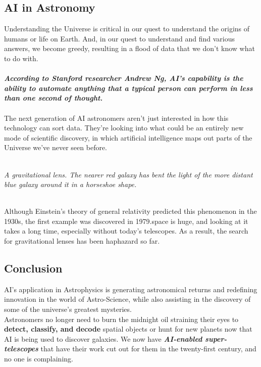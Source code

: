 \documentclass[12pt]{article}
\begin{document}
\subsection* {AI in Astronomy} 
Understanding the Universe is critical in our quest to understand the origins of humans or life on Earth. And, in our quest to understand and find various answers, we become greedy, resulting in a flood of data that we don't know what to do with.
\\
\\
\textbf{\textit{According to Stanford researcher Andrew Ng, AI's capability is the ability to automate anything that a typical person can perform in less than one second of thought.}}
\\
\\
The next generation of AI astronomers aren't just interested in how this technology can sort data. They're looking into what could be an entirely new mode of scientific discovery, in which artificial intelligence maps out parts of the Universe we've never seen before.
\begin{center}

\\
\textit{A gravitational lens. The nearer red galaxy has bent the light of the more distant blue galaxy around it in a horseshoe shape.}
\end{center}
\\
Although Einstein's theory of general relativity predicted this phenomenon in the 1930s, the first example was discovered in 1979.space is huge, and looking at it takes a long time, especially without today's telescopes. As a result, the search for gravitational lenses has been haphazard so far.
\subsection* {Conclusion}
AI's application in Astrophysics is generating astronomical returns and redefining innovation in the world of Astro-Science, while also assisting in the discovery of some of the universe's greatest mysteries.
\\
Astronomers no longer need to burn the midnight oil straining their eyes to \textbf{detect, classify, and decode} spatial objects or hunt for new planets now that AI is being used to discover galaxies. We now have \textbf{\textit{AI-enabled super-telescopes}} that have their work cut out for them in the twenty-first century, and no one is complaining.
\end{document}
